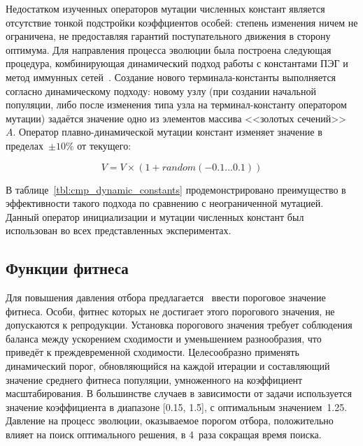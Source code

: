 Недостатком изученных операторов мутации численных констант является отсутствие тонкой подстройки коэффциентов особей: степень изменения ничем не ограничена, не предоставляя гарантий поступательного движения в сторону оптимума. Для направления процесса эволюции была построена следующая процедура, комбинирующая динамический подход работы с константами ПЭГ и метод иммунных сетей~\cite{SergMir_02_2014_radio}. Создание нового терминала-константы выполняется согласно динамическому подходу: новому узлу (при создании начальной популяции, либо после изменения типа узла на терминал-константу оператором мутации) задаётся значение одно из элементов массива <<золотых сечений>>~$A$. Оператор плавно-динамической мутации констант изменяет значение в пределах~$\pm10\%$ от текущего:

\begin{equation}
\label{eq:zerg_const_mutation}
V = V \times (1 + random(-0.1\ldots0.1))
\end{equation}

В таблице~\ref{tbl:cmp_dynamic_constants} продемонстрировано преимущество в эффективности такого подхода по сравнению с неограниченной мутацией. Данный оператор инициализации и мутации численных констант был использован во всех представленных экспериментах.








\subsection{Функции фитнеса}

Для повышения давления отбора предлагается~\cite{2008acat.confE.66T, SergMir_03_2013_comint} ввести пороговое значение фитнеса. Особи, фитнес которых не достигает этого порогового значения, не допускаются к репродукции. Установка порогового значения требует соблюдения баланса между ускорением сходимости и уменьшением разнообразия, что приведёт к преждевременной сходимости. Целесообразно применять динамический порог, обновляющийся на каждой итерации и составляющий значение среднего фитнеса популяции, умноженного на коэффициент масштабирования. В большинстве случаев в зависимости от задачи используется значение коэффициента в диапазоне [0.15, 1.5], с оптимальным значением~1.25. Давление на процесс эволюции, оказываемое порогом отбора, положительно влияет на поиск оптимального решения, в 4~раза сокращая время поиска.

